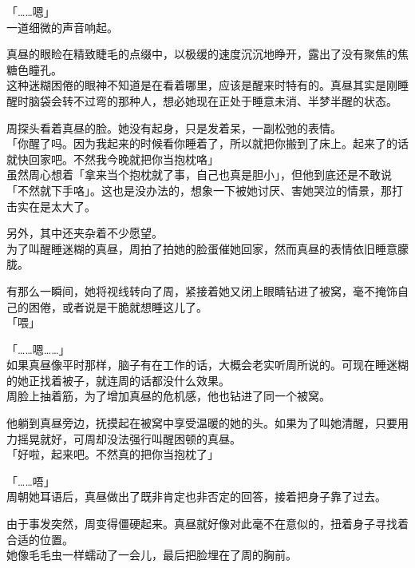 「……嗯」\\

一道细微的声音响起。

真昼的眼睑在精致睫毛的点缀中，以极缓的速度沉沉地睁开，露出了没有聚焦的焦糖色瞳孔。\\

这种迷糊困倦的眼神不知道是在看着哪里，应该是醒来时特有的。真昼其实是刚睡醒时脑袋会转不过弯的那种人，想必她现在正处于睡意未消、半梦半醒的状态。

周探头看着真昼的脸。她没有起身，只是发着呆，一副松弛的表情。\\

「你醒了吗。因为我起来的时候看你睡着了，所以就把你搬到了床上。起来了的话就快回家吧。不然我今晚就把你当抱枕咯」\\

虽然周心想着「拿来当个抱枕就了事，自己也真是胆小」，但他到底还是不敢说「不然就下手咯」。这也是没办法的，想象一下被她讨厌、害她哭泣的情景，那打击实在是太大了。

另外，其中还夹杂着不少愿望。\\

为了叫醒睡迷糊的真昼，周拍了拍她的脸蛋催她回家，然而真昼的表情依旧睡意朦胧。

有那么一瞬间，她将视线转向了周，紧接着她又闭上眼睛钻进了被窝，毫不掩饰自己的困倦，或者说是干脆就想睡这儿了。\\

「喂」

「……嗯……」\\

如果真昼像平时那样，脑子有在工作的话，大概会老实听周所说的。可现在睡迷糊的她正找着被子，就连周的话都没什么效果。\\

周脸上抽着筋，为了增加真昼的危机感，他也钻进了同一个被窝。

他躺到真昼旁边，抚摸起在被窝中享受温暖的她的头。如果为了叫她清醒，只要用力摇晃就好，可周却没法强行叫醒困顿的真昼。\\

「好啦，起来吧。不然真的把你当抱枕了」

「……唔」\\

周朝她耳语后，真昼做出了既非肯定也非否定的回答，接着把身子靠了过去。

由于事发突然，周变得僵硬起来。真昼就好像对此毫不在意似的，扭着身子寻找着合适的位置。\\

她像毛毛虫一样蠕动了一会儿，最后把脸埋在了周的胸前。


